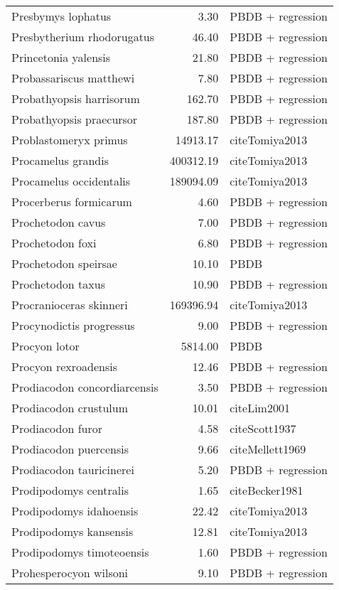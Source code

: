 \begin{table}[ht]
\begin{tabular}{lrl}
  Presbymys lophatus & 3.30 & PBDB + regression \\ 
  Presbytherium rhodorugatus & 46.40 & PBDB + regression \\ 
  Princetonia yalensis & 21.80 & PBDB + regression \\ 
  Probassariscus matthewi & 7.80 & PBDB + regression \\ 
  Probathyopsis harrisorum & 162.70 & PBDB + regression \\ 
  Probathyopsis praecursor & 187.80 & PBDB + regression \\ 
  Problastomeryx primus & 14913.17 & cite{Tomiya2013} \\ 
  Procamelus grandis & 400312.19 & cite{Tomiya2013} \\ 
  Procamelus occidentalis & 189094.09 & cite{Tomiya2013} \\ 
  Procerberus formicarum & 4.60 & PBDB + regression \\ 
  Prochetodon cavus & 7.00 & PBDB + regression \\ 
  Prochetodon foxi & 6.80 & PBDB + regression \\ 
  Prochetodon speirsae & 10.10 & PBDB \\ 
  Prochetodon taxus & 10.90 & PBDB + regression \\ 
  Procranioceras skinneri & 169396.94 & cite{Tomiya2013} \\ 
  Procynodictis progressus & 9.00 & PBDB + regression \\ 
  Procyon lotor & 5814.00 & PBDB \\ 
  Procyon rexroadensis & 12.46 & PBDB + regression \\ 
  Prodiacodon concordiarcensis & 3.50 & PBDB + regression \\ 
  Prodiacodon crustulum & 10.01 & cite{Lim2001} \\ 
  Prodiacodon furor & 4.58 & cite{Scott1937} \\ 
  Prodiacodon puercensis & 9.66 & cite{Mellett1969} \\ 
  Prodiacodon tauricinerei & 5.20 & PBDB + regression \\ 
  Prodipodomys centralis & 1.65 & cite{Becker1981} \\ 
  Prodipodomys idahoensis & 22.42 & cite{Tomiya2013} \\ 
  Prodipodomys kansensis & 12.81 & cite{Tomiya2013} \\ 
  Prodipodomys timoteoensis & 1.60 & PBDB + regression \\ 
  Prohesperocyon wilsoni & 9.10 & PBDB + regression \\ 

\end{tabular}
\end{table}
